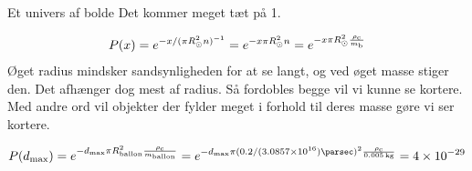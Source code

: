 \documentclass[crop=false, class=memoir]{standalone}
\begin{document}
\begin{opgave}{Et univers af bolde}
Det kommer meget tæt på 1. %
%


\opg 

\begin{align}
	P(x) = e^{-x/(\pi R_\odot^2 n)^{-1}} = e^{-x \pi R_\odot^2 n} = e^{-x \pi R_\odot^2 \frac{\rho_\textup{c}}{m_\textup{b}}}
\end{align}
Øget radius mindsker sandsynligheden for at se langt, og ved øget masse stiger den. Det afhænger dog mest af radius. Så fordobles begge vil vi kunne se kortere. Med andre ord vil objekter der fylder meget i forhold til deres masse gøre vi ser kortere. 

\opg 

\begin{align}
    P(d_\textup{max})  = e^{-d_\textup{max} \pi R_\textup{ballon}^2 \frac{\rho_\textup{c}}{m_\textup{ballon}}} =  e^{-d_\textup{max} \pi (0.2/(\num{3.0857e16}) \si{\parsec})^2 \frac{\rho_\textup{c}}{\SI{0.005}{\kilogram}}} = \num{4e-29}
\end{align}


\end{opgave}
\end{document}
